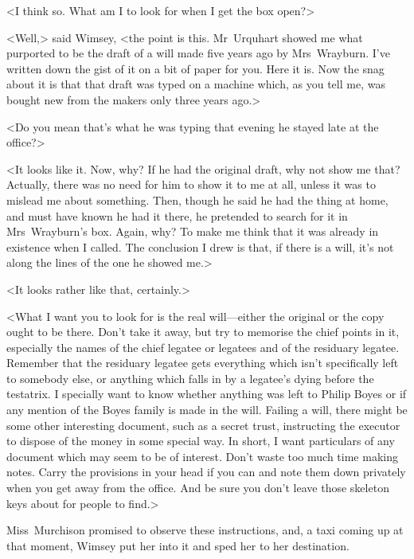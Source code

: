 <I think so. What am I to look for when I get the box open?>

<Well,> said Wimsey, <the point is this. Mr~Urquhart showed me what purported to be the draft of a will made five years ago by Mrs~Wrayburn. I've written down the gist of it on a bit of paper for you. Here it is. Now the snag about it is that that draft was typed on a machine which, as you tell me, was bought new from the makers only three years ago.>

<Do you mean that's what he was typing that evening he stayed late at the office?>

<It looks like it. Now, why? If he had the original draft, why not show me that? Actually, there was no need for him to show it to me at all, unless it was to mislead me about something. Then, though he said he had the thing at home, and must have known he had it there, he pretended to search for it in Mrs~Wrayburn's box. Again, why? To make me think that it was already in existence when I called. The conclusion I drew is that, if there is a will, it's not along the lines of the one he showed me.>

<It looks rather like that, certainly.>

<What I want you to look for is the real will—either the original or the copy ought to be there. Don't take it away, but try to memorise the chief points in it, especially the names of the chief legatee or legatees and of the residuary legatee. Remember that the residuary legatee gets everything which isn't specifically left to somebody else, or anything which falls in by a legatee's dying before the testatrix. I specially want to know whether anything was left to Philip Boyes or if any mention of the Boyes family is made in the will. Failing a will, there might be some other interesting document, such as a secret trust, instructing the executor to dispose of the money in some special way. In short, I want particulars of any document which may seem to be of interest. Don't waste too much time making notes. Carry the provisions in your head if you can and note them down privately when you get away from the office. And be sure you don't leave those skeleton keys about for people to find.>

Miss~Murchison promised to observe these instructions, and, a taxi coming up at that moment, Wimsey put her into it and sped her to her destination.